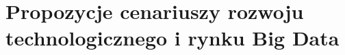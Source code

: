 \section{Propozycje cenariuszy rozwoju technologicznego i rynku Big Data}
\label{sec:propozycje_cenariuszy_rozwoju_technologicznego_i_rynku_big_data}


